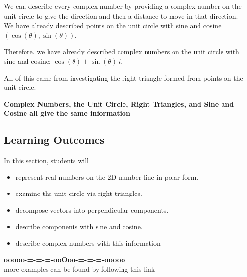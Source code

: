 \documentclass{ximera}
\begin{document}
We can describe every complex number by providing a complex number on the unit circle to give the direction and then a distance to move in that direction.  \\ 

We have already described points on the unit circle with sine and cosine: $(\cos(\theta), \sin(\theta))$. 

Therefore, we have already described complex numbers on the unit circle with sine and cosine: $\cos(\theta) + \sin(\theta) \, i$.  


All of this came from investigating the right triangle formed from points on the unit circle. \\



\begin{center}
\textbf{\textcolor{purple!85!blue}{Complex Numbers, the Unit Circle, Right Triangles, and Sine and Cosine all give the same information}}
\end{center}







\subsection*{Learning Outcomes}



\begin{sectionOutcomes}
In this section, students will 

\begin{itemize}
\item represent real numbers on the 2D number line in polar form.
\item examine the unit circle via right triangles.
\item decompose vectors into perpendicular components.
\item describe components with sine and cosine.
\item describe complex numbers with this information
\end{itemize}
\end{sectionOutcomes}












\begin{center}
\textbf{\textcolor{green!50!black}{ooooo-=-=-=-ooOoo-=-=-=-ooooo}} \\

more examples can be found by following this link\\ 

\end{center}
\end{document}
